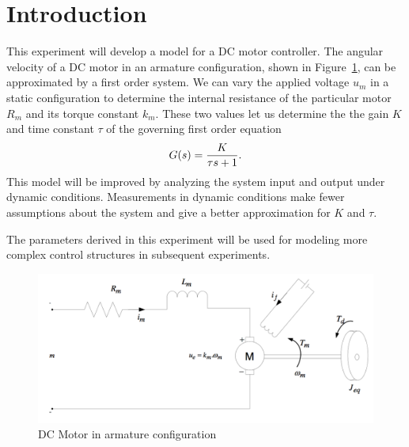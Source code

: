 \section{Introduction}\label{sec:intro}
This experiment will develop a model for a DC motor controller.
The angular velocity of a DC motor in an armature configuration, shown in Figure~\ref{fig:motorschematic}, can be approximated by a first order system.
We can vary the applied voltage $u_m$ in a static configuration to determine the internal resistance of the particular motor $R_m$ and its torque constant $k_m$.
These two values let us determine the the gain $K$ and time constant $\tau$ of the governing first order equation
\begin{equation}\label{eq:tf}
  G(s) = {K \over \tau s + 1}.
\end{equation}
This model will be improved by analyzing the system input and output under dynamic conditions.
Measurements in dynamic conditions make fewer assumptions about the system and give a better approximation for $K$ and $\tau$.

The parameters derived in this experiment will be used for modeling more complex control structures in subsequent experiments.
\begin{figure}[tbph]
  \centering
  \includegraphics[width=0.7\linewidth]{graphics/motorSchematic}
  \caption{DC Motor in armature configuration}
  \label{fig:motorschematic}
\end{figure}

